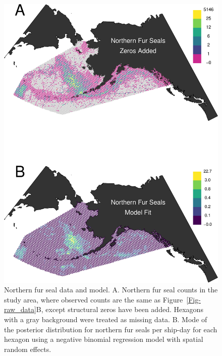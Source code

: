 \documentclass[11pt, titlepage]{article}
\begin{document}
\begin{spacing}{1.9}
\begin{flushleft}
\begin{figure}[H]
  \begin{center}
  \includegraphics[width=.75\linewidth]{Fig-FurSealFit}
  \end{center}
  \caption{Northern fur seal data and model. A. Northern fur seal counts in the study area, where observed counts are the same as Figure~\ref{Fig-raw_data}B, except structural zeros have been added. Hexagons with a gray background were treated as missing data. B. Mode of the posterior distribution for northern fur seals per ship-day for each hexagon using a negative binomial regression model with spatial random effects.   \label{Fig-FurSealFit}}         
\end{figure} 


\end{flushleft}
\end{spacing}
\end{document}
